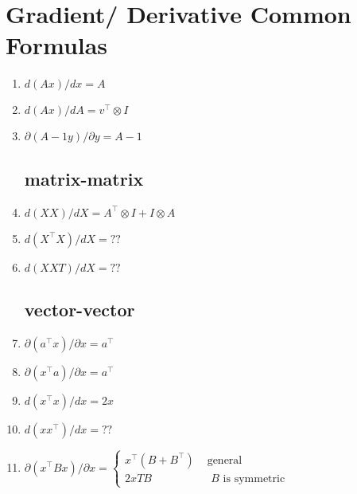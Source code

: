 \section{Gradient/ Derivative Common Formulas}\label{matrix-vector: Gradient/ Derivative Common Formulas}

\begin{enumerate}
    \subsection{Matrix-vector}
    
    \item \( d(Ax)/dx = A \)

    \item $d(Ax)/dA = v^\top\otimes I $
    
    \item \( \partial (A-1y)/\partial y = A-1 \)

    \subsection{matrix-matrix}
    \item \(
        d(XX)/dX = A^\top \otimes I+I\otimes A
    \)
    
    \item  $d(X^\top X)/dX = ??$
    
    \item  $d(XXT)/dX = ??$

    \subsection{vector-vector}
    \item  $\partial (a^\top x)/\partial x = a^\top$

    \item $\partial (x^\top a)/\partial x = a^\top$

    \item  $d(x^\top x)/dx = 2x$

    \item  $d(xx^\top)/dx = ??$

    \item  \(
        \partial (x^\top Bx)/\partial x = \begin{cases}
            x^\top(B + B^\top) & \text{ general}\\
            2xTB & \text{ $B$ is symmetric}
        \end{cases}
    \)


\end{enumerate}
